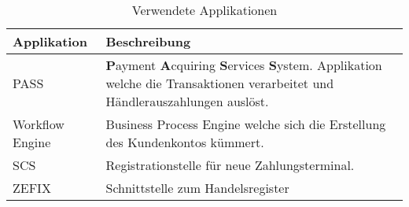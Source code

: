 \begin{table}[H]
	\centering
	\caption{Verwendete Applikationen}
	\begin{tabular}{ | p{2cm} | p{14cm} | }
		\toprule
		{\textbf{Applikation}} & {\textbf{Beschreibung}} \\
		\midrule
		PASS & \textbf{P}ayment \textbf{A}cquiring \textbf{S}ervices \textbf{S}ystem. Applikation welche die Transaktionen verarbeitet und Händlerauszahlungen auslöst. \\ \hline
		Workflow Engine & Business Process Engine welche sich die Erstellung des Kundenkontos kümmert.\\ \hline
		SCS & Registrationstelle für neue Zahlungsterminal.\\ \hline
		ZEFIX & Schnittstelle zum Handelsregister\\
		\bottomrule
	\end{tabular}
\end{table}

